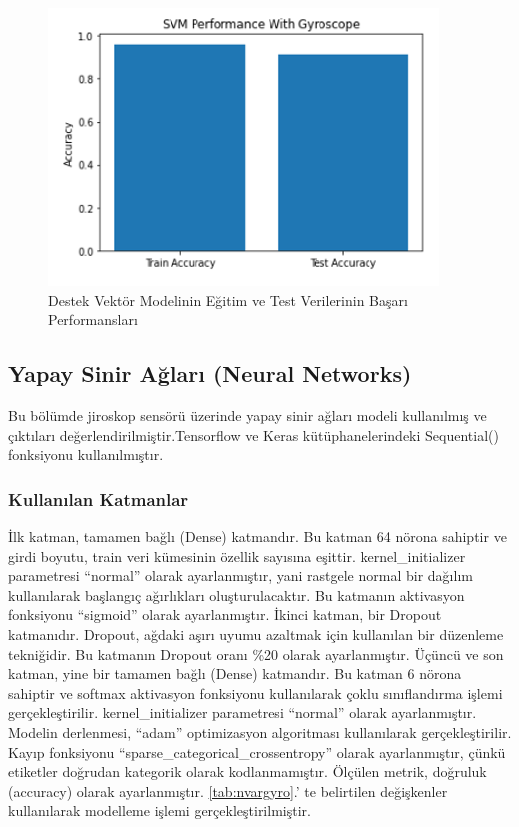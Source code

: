 \documentclass[12pt,twoside]{deuthesis}
\begin{document}
\begin{figure}

{\centering \includegraphics[width=0.6\linewidth,height=0.25\textheight]{figure/svm_testtrain} 

}

\caption{Destek Vektör Modelinin Eğitim ve Test Verilerinin Başarı Performansları}\label{fig:svmtesttrain}
\end{figure}
\hypertarget{yapay-sinir-aux11flarux131-neural-networks}{%
\subsection{Yapay Sinir Ağları (Neural Networks)}\label{yapay-sinir-aux11flarux131-neural-networks}}

Bu bölümde jiroskop sensörü üzerinde yapay sinir ağları modeli kullanılmış ve çıktıları değerlendirilmiştir.Tensorflow ve Keras kütüphanelerindeki Sequential() fonksiyonu kullanılmıştır.

\hypertarget{kullanux131lan-katmanlar}{%
\subsubsection{Kullanılan Katmanlar}\label{kullanux131lan-katmanlar}}

İlk katman, tamamen bağlı (Dense) katmandır. Bu katman 64 nörona sahiptir ve girdi boyutu, train veri kümesinin özellik sayısına eşittir. kernel\_initializer parametresi ``normal'' olarak ayarlanmıştır, yani rastgele normal bir dağılım kullanılarak başlangıç ağırlıkları oluşturulacaktır. Bu katmanın aktivasyon fonksiyonu ``sigmoid'' olarak ayarlanmıştır.
İkinci katman, bir Dropout katmanıdır. Dropout, ağdaki aşırı uyumu azaltmak için kullanılan bir düzenleme tekniğidir. Bu katmanın Dropout oranı \%20 olarak ayarlanmıştır.
Üçüncü ve son katman, yine bir tamamen bağlı (Dense) katmandır. Bu katman 6 nörona sahiptir ve softmax aktivasyon fonksiyonu kullanılarak çoklu sınıflandırma işlemi gerçekleştirilir. kernel\_initializer parametresi ``normal'' olarak ayarlanmıştır.
Modelin derlenmesi, ``adam'' optimizasyon algoritması kullanılarak gerçekleştirilir. Kayıp fonksiyonu ``sparse\_categorical\_crossentropy'' olarak ayarlanmıştır, çünkü etiketler doğrudan kategorik olarak kodlanmamıştır. Ölçülen metrik, doğruluk (accuracy) olarak ayarlanmıştır.
\ref{tab:nvargyro}.' te belirtilen değişkenler kullanılarak modelleme işlemi gerçekleştirilmiştir.
\end{document}
